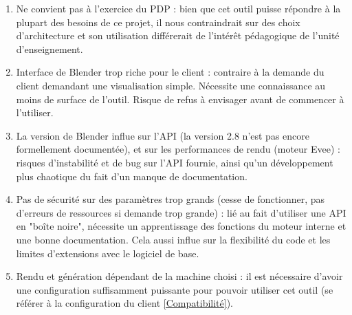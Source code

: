 \documentclass[a4paper]{article}
\begin{document}
    \begin{enumerate}
                
                \item {Ne convient pas à l'exercice du PDP :}
                bien que cet outil puisse répondre à la plupart des besoins de ce projet, il nous contraindrait sur des choix d'architecture et son utilisation différerait de l'intérêt pédagogique de l'unité d'enseignement.
                
                \item {Interface de Blender trop riche pour le client :}
                contraire à la demande du client demandant une visualisation simple. Nécessite une connaissance au moins de surface de l'outil. Risque de refus à envisager avant de commencer à l'utiliser.
                
                \item {La version de Blender influe sur l'API (la version 2.8 n'est pas encore formellement documentée), et sur les performances de rendu (moteur Evee) :}
                risques d'instabilité et de bug sur l'API fournie, ainsi qu'un développement plus chaotique du fait d'un manque de documentation.
                
                \item {Pas de sécurité sur des paramètres trop grands (cesse de fonctionner, pas d'erreurs de ressources si demande trop grande) :}
                lié au fait d'utiliser une API en "boîte noire", nécessite un apprentissage des fonctions du moteur interne et une bonne documentation. Cela aussi influe sur la flexibilité du code et les limites d'extensions avec le logiciel de base.
                
                \item {Rendu et génération dépendant de la machine choisi :}
                il est nécessaire d'avoir une configuration suffisamment puissante pour pouvoir utiliser cet outil (se référer à la configuration du client \ref{Compatibilité}).
                
    \end{enumerate}
    
\newpage
\end{document}

